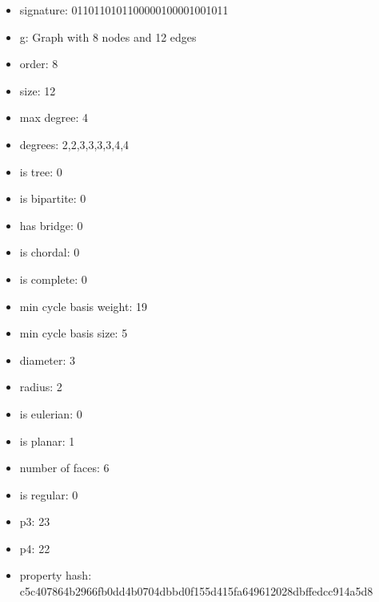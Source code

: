 \begin{itemize}
\item signature: 0110110101100000100001001011
\item g: Graph with 8 nodes and 12 edges
\item order: 8
\item size: 12
\item max degree: 4
\item degrees: 2,2,3,3,3,3,4,4
\item is tree: 0
\item is bipartite: 0
\item has bridge: 0
\item is chordal: 0
\item is complete: 0
\item min cycle basis weight: 19
\item min cycle basis size: 5
\item diameter: 3
\item radius: 2
\item is eulerian: 0
\item is planar: 1
\item number of faces: 6
\item is regular: 0
\item p3: 23
\item p4: 22
\item property hash: c5c407864b2966fb0dd4b0704dbbd0f155d415fa649612028dbffedcc914a5d8
\end{itemize}
\newpage
\begin{figure}
\end{figure}
